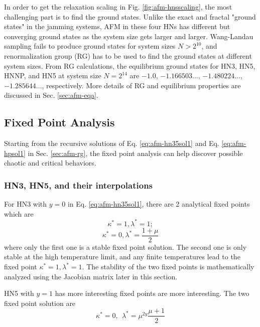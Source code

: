 In order to get the relaxation scaling in Fig. \ref{fig:afm-hnsscaling}, the most challenging part is to find the ground states. Unlike the exact and fractal "ground states" in the jamming systems, AFM in these four HNs has different but converging ground states as the system size gets larger and larger. Wang-Landau sampling fails to produce ground states for system sizes $N>2^{10}$, and renormalization group (RG) has to be used to find the ground states at different system sizes. From RG calculations, the equilibrium ground states for HN3, HN5, HNNP, and HN5 at system size $N=2^{14}$ are $-1.0$, $-1.166503...$, $-1.480224...$, $-1.285644...$, respectively.  More details of  RG and equilibrium properties are discussed in Sec. \ref{sec:afm-eqa}.

\subsection{Fixed Point Analysis}
\label{sec:afm-fpa}
Starting from the recursive solutions of Eq. \ref{eq:afm-hn35sol1} and Eq. \ref{eq:afm-hpsol1} in Sec. \ref{sec:afm-rg}, the fixed point analysis can help discover possible chaotic and critical behaviors. 

\subsubsection{ HN3, HN5, and their interpolations }
For HN3 with $y=0$ in Eq. \ref{eq:afm-hn35sol1}, there are 2 analytical fixed points which are
\begin{equation}
\displaystyle \kappa^* = 1, \lambda^* =1; 
\label{eq:afm-fps3-1}
\end{equation}
\begin{equation}
\displaystyle \kappa^* = 0, \lambda^* =\frac{1+\mu}{2} 
\label{eq:afm-fps3-2}
\end{equation}
where only the first one is a stable fixed point solution. The second one is only stable at the high temperature limit, and any finite temperatures lead to the fixed point $\kappa^* =1, \lambda^* = 1.$ The stability of the two fixed points is mathematically analyzed using the Jacobian matrix later in this section.

HN5 with $y=1$ has more interesting fixed points are more interesting. The two fixed point solution are
\begin{equation}
\kappa^* = 0, \ \  \lambda^* = \mu^{2y}\frac{\mu+1}{2}
\label{eq:afm-fps5-1}
\end{equation}

